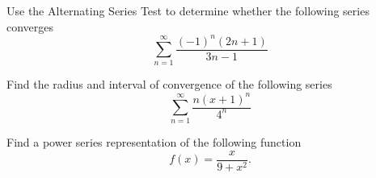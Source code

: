\documentclass[11pt]{exam}
\begin{document}
\begin{questions}
\newpage
\addpoints 
\question[2] Use the Alternating Series Test to determine whether the following series converges
\begin{equation*}
\sum_{n=1}^{\infty} \frac{(-1)^n(2n+1)}{3n-1}
\end{equation*}

\newpage
\addpoints
\question[3] Find the radius and interval of convergence of the following series
\begin{equation*}
\sum_{n=1}^{\infty} \frac{n(x+1)^n}{4^n}
\end{equation*}


\newpage
\addpoints
\question[3] Find a power series representation of the following function
\begin{equation*}
f(x)=\frac{x}{9+x^2}.
\end{equation*}
\end{questions}
\end{document}
